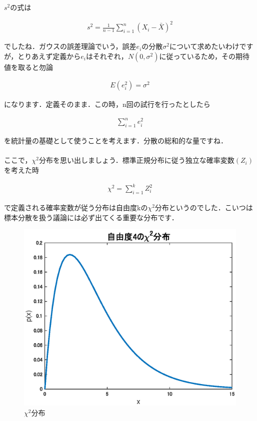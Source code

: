 \documentclass[11pt,a4paper,uplatex]{ujreport} 	%
\begin{document}
$s^2$の式は

\begin{align}
  s^2 = \frac{1}{n-1}\sum_{i=1}^n (X_i - \bar{X})^2
\end{align}

でしたね．ガウスの誤差理論でいう，誤差$e_i$の分散$\sigma^2$について求めたいわけですが，とりあえず定義から$e_i$はそれぞれ，$N(0,\sigma^2)$に従っているため，その期待値を取ると勿論

\begin{align}
  E(e_i^2) = \sigma^2
\end{align}

になります．定義そのまま．この時，n回の試行を行ったとしたら

\begin{align}
  \sum_{i=1}^n e_i^2
\end{align}

を統計量の基礎として使うことを考えます．分散の総和的な量ですね．\\
\\


ここで，$\chi^2$分布を思い出しましょう．標準正規分布に従う独立な確率変数$(Z_i)$を考えた時

\begin{align}
  \chi^2 = \sum_{i=1}^k Z_i^2
\end{align}

で定義される確率変数が従う分布は自由度kの$\chi^2$分布というのでした．こいつは標本分散を扱う議論には必ず出てくる重要な分布です．\\

\begin{figure}[H]
  \centering
  \includegraphics[width=12cm]{../figures/chi2.eps}
  \caption{$\chi^2$分布}
\end{figure}
\end{document}
